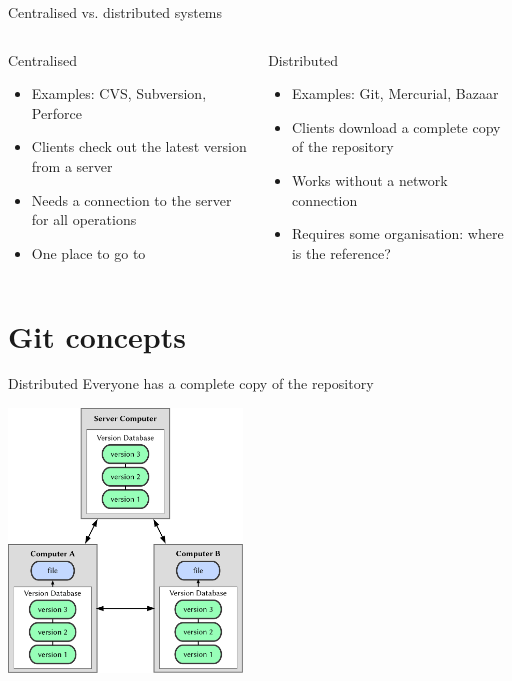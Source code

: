 \documentclass{beamer}
\begin{document}
\begin{frame}{Centralised vs. distributed systems}
  \begin{columns}[t]
    \begin{column}{5.5cm}
      \begin{block}{Centralised}
        \begin{itemize}
        \item Examples: CVS, Subversion, Perforce
        \item Clients check out the latest version from a server
        \item Needs a connection to the server for all operations
        \item One place to go to
        \end{itemize}
      \end{block}
    \end{column}
    \begin{column}{5.5cm}
      \begin{block}{Distributed}
        \begin{itemize}
        \item Examples: Git, Mercurial, Bazaar
        \item Clients download a complete copy of the repository
        \item Works without a network connection
        \item Requires some organisation: where is the reference?
        \end{itemize}
      \end{block}
    \end{column}
  \end{columns}
\end{frame}

\section{Git concepts}

\begin{frame}{Distributed}
  Everyone has a complete copy of the repository
  \begin{center}
    \includegraphics[height=7cm]{images/fig0103.pdf}
  \end{center}
\end{frame}
\end{document}
